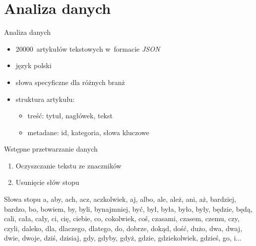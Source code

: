 \documentclass{beamer}
\begin{document}
	\section{Analiza danych}
	\begin{frame}{Analiza danych}
		\begin{itemize}
			\item 20000~artykułów tekstowych w~formacie \textit{JSON}
			\item język polski
			\item słowa specyficzne dla różnych branż
			\item struktura artykułu:
			\begin{itemize}
				\item treść: tytuł, nagłówek, tekst
				\item metadane: id, kategoria, słowa kluczowe
			\end{itemize}
		\end{itemize}
	\end{frame}
	\begin{frame}{Wstępne przetwarzanie danych}
		\begin{enumerate}
			\item Oczyszczanie tekstu ze znaczników
			\item Usunięcie słów stopu
		\end{enumerate}
	\end{frame}
	\begin{frame}{Słowa stopu}
		a, aby, ach, acz, aczkolwiek, aj, albo, ale, ależ, ani, aż, bardziej, bardzo, bo, bowiem, by, byli, bynajmniej, być, był, była, było, były, będzie, będą, cali, cała, cały, ci, cię, ciebie, co, cokolwiek, coś, czasami, czasem, czemu, czy, czyli, daleko, dla, dlaczego, dlatego, do, dobrze, dokąd, dość, dużo, dwa, dwaj, dwie, dwoje, dziś, dzisiaj, gdy, gdyby, gdyż, gdzie, gdziekolwiek, gdzieś, go, i...
	\end{frame}
\end{document}
